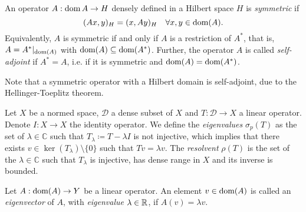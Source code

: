 \begin{definition}\label{def:symmetric-selfadjoint}
    An operator $A:\operatorname{\text{dom}} A\to H$ densely defined in a Hilbert space $H$ is \textit{symmetric} if 
    \begin{equation}
        (Ax,y)_H = (x,Ay)_H \quad \forall x,y\in\operatorname{\text{dom}}(A).
    \end{equation}
    Equivalently, $A$ is symmetric if and only if $A$ is a restriction of $A^*$, that is, $A=A^*|_{\operatorname{\text{dom}}(A)}$ with $\operatorname{\text{dom}}(A)\subseteq \operatorname{\text{dom}}(A^*)$. Further, the operator $A$ is called \textit{self-adjoint} if $A^*=A$, i.e. if it is symmetric and $\operatorname{\text{dom}}(A) = \operatorname{\text{dom}}(A^*)$.  
\end{definition}
Note that a symmetric operator with a Hilbert domain is self-adjoint, due to the Hellinger-Toeplitz theorem.
\begin{definition}\label{def:eigenvalues-resolvent}
    Let $X$ be a normed space, $\mathcal{D}$ a dense subset of $X$ and $T:\mathcal{D}\to X$ a linear operator. Denote $I:X\to X$ the identity operator. We define the \textit{eigenvalues} $\sigma_p(T)$ as the set of $\lambda\in\mathbb{C}$ such that $T_\lambda  \coloneqq  T - \lambda I$ is not injective, which implies that there exists $v\in \ker(T_\lambda)\setminus \{0\}$ such that $Tv=\lambda v$. The \textit{resolvent} $\rho(T)$ is the set of the $\lambda\in\mathbb{C}$ such that $T_\lambda$ is injective, has dense range in $X$ and its inverse is bounded.
\end{definition}
\begin{definition}\label{def:eigenvalues-eigenvectors}
    Let $A:\operatorname{\text{dom}}(A)\to Y$ be a linear operator. An element $v\in \operatorname{\text{dom}}(A)$ is called an \textit{eigenvector} of $A$, with \textit{eigenvalue} $\lambda\in\mathbb{R}$, if $A(v) = \lambda v$. 
\end{definition}


